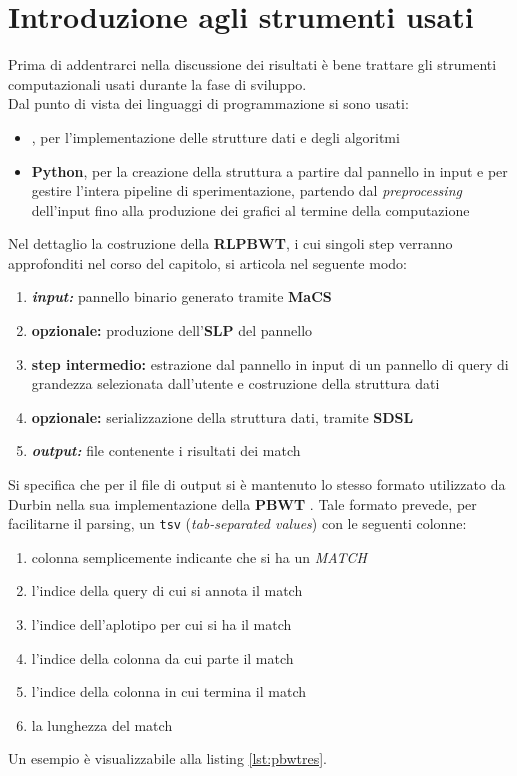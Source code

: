 \section{Introduzione agli strumenti usati}
Prima di addentrarci nella discussione dei risultati è bene trattare gli
strumenti computazionali usati durante la fase di sviluppo.\\
Dal punto di vista dei linguaggi di programmazione si sono usati:
\begin{itemize}
  \item \textbf{\Cplusplus}, per l'implementazione delle strutture dati e degli
  algoritmi
  \item \textbf{Python}, per la creazione della struttura a partire dal
  pannello in input e per gestire l'intera pipeline di sperimentazione,
  partendo dal \textit{preprocessing} dell'input fino alla produzione dei
  grafici al termine della computazione
\end{itemize}
Nel dettaglio la costruzione della \textbf{RLPBWT}, i cui
singoli step verranno approfonditi nel corso del capitolo, si articola nel
seguente modo: 
\begin{enumerate}
  \item \textit{\textbf{input:}} pannello binario generato tramite
  \textbf{MaCS}
  \item \textbf{opzionale:} produzione dell'\textbf{SLP} del pannello
  \item \textbf{step intermedio:} estrazione dal pannello in input di un
  pannello di query di grandezza selezionata dall'utente e costruzione della
  struttura dati  
  \item \textbf{opzionale:} serializzazione della struttura dati, tramite
  \textbf{SDSL} 
  \item \textit{\textbf{output:}} file contenente i risultati dei match
\end{enumerate}
Si specifica che per il file di output si è mantenuto lo stesso formato
utilizzato da Durbin nella sua implementazione della \textbf{PBWT}
\cite{durbin_gh}. Tale formato prevede, per facilitarne il parsing, un
\texttt{tsv} (\textit{tab-separated values}) con le seguenti colonne:
\begin{enumerate}
  \item colonna semplicemente indicante che si ha un \textit{MATCH}
  \item l'indice della query di cui si annota il match
  \item l'indice dell'aplotipo per cui si ha il match
  \item l'indice della colonna da cui parte il match
  \item l'indice della colonna in cui termina il match
  \item la lunghezza del match
\end{enumerate}
Un esempio è visualizzabile alla listing \ref{lst:pbwtres}.
